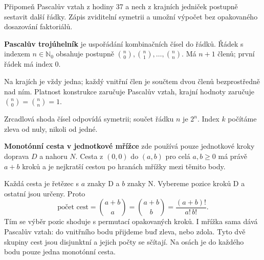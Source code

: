 \documentclass[11pt,a4paper]{article}
\begin{document}
Připomeň Pascalův vztah z hodiny 37 a nech z krajních jedniček postupně sestavit další řádky. Zápis zviditelní symetrii a umožní výpočet bez opakovaného dosazování faktoriálů.

\begin{definiceBox}
\textbf{Pascalův trojúhelník} je uspořádání kombinačních čísel do řádků. Řádek s indexem $n\in\mathbb N_0$ obsahuje postupně $\binom n0,\binom n1,\ldots,\binom nn$. Má $n+1$ členů; první řádek má index $0$.
\end{definiceBox}

Na krajích je vždy jedna; každý vnitřní člen je součtem dvou členů bezprostředně nad ním. Platnost konstrukce zaručuje Pascalův vztah, krajní hodnoty zaručuje $\binom n0=\binom nn=1$.
\begin{center}
\end{center}
Zrcadlová shoda čísel odpovídá symetrii; součet řádku $n$ je $2^n$. Index $k$ počítáme zleva od nuly, nikoli od jedné.\begin{definiceBox}
\textbf{Monotónní cesta v jednotkové mřížce} zde používá pouze jednotkové kroky doprava $D$ a nahoru $N$. Cesta z $(0,0)$ do $(a,b)$ pro celá $a,b\geq0$ má právě $a+b$ kroků a je nejkratší cestou po hranách mřížky mezi těmito body.
\end{definiceBox}

Každá cesta je řetězec s $a$ znaky D a $b$ znaky N. Vybereme pozice kroků D a ostatní jsou určeny. Proto
\[
 \text{počet cest}=\binom{a+b}{a}=\binom{a+b}{b}
 =\frac{(a+b)!}{a!\,b!}.
\]
Tím se výběr pozic shoduje s permutací opakovaných kroků. I mřížka sama dává Pascalův vztah: do vnitřního bodu přijdeme buď zleva, nebo zdola. Tyto dvě skupiny cest jsou disjunktní a jejich počty se sčítají. Na osách je do každého bodu pouze jedna monotónní cesta.
\end{document}
